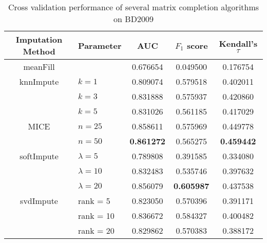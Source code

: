 \begin{table}[htbp]
\centering
\begin{tabular}{cl||ccc}
\toprule
Imputation Method & Parameter & AUC & $F_1$ score & Kendall's $\tau$ \\
\midrule 
meanFill & &   0.676654 &  0.049500 &  0.176754 \\
\midrule
knnImpute & $k = 1$ &  0.809074 &  0.579518 &  0.402011 \\
  & $k = 3$  &  0.831888 &  0.575937 &  0.420860 \\
  & $k = 5$ &  0.831026 &  0.561185 &  0.417029 \\
\midrule
MICE & $n = 25$  &  0.858611 &  0.575969 &  0.449778 \\
     & $n = 50$  &  {\bf 0.861272} &  0.565275 &  {\bf 0.459442} \\
\midrule
softImpute & $\lambda=5$ &  0.789808 &  0.391585 &  0.334080 \\
& $\lambda=10$ &  0.832483 &  0.535746 &  0.397632 \\
& $\lambda=20$ &  0.856079 &  {\bf 0.605987} &  0.437538 \\
             
\midrule
svdImpute & rank = 5  &  0.823050 &  0.570396 &  0.391171 \\
& rank = 10  &  0.836672 &  0.584327 &  0.400482 \\
& rank = 20  &  0.829862 &  0.570383 &  0.388172 \\
\bottomrule[1.25pt]
\end{tabular}
\begin{center}
\caption{Cross validation performance of several matrix completion algorithms on BD2009} \label{tab:imputation}
\end{center}
\end{table}

